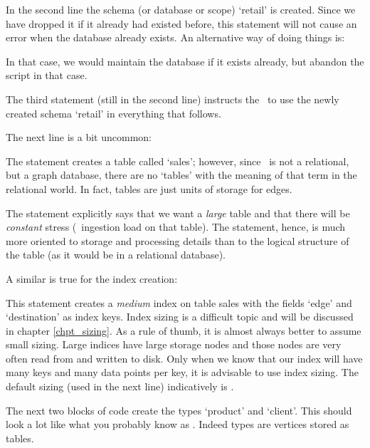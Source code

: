 In the second line the schema
(or database or scope) `retail'
is created. Since we have dropped it
if it already had existed before,
this statement will not cause
an error when the database already exists.
An alternative way of doing things is:


In that case, we would maintain the database
if it exists already, but abandon the
script in that case.

The third statement (still in the second line)
instructs the \nowdb\ to use the newly created
schema `retail' in everything that follows.

The next line is a bit uncommon:


The statement creates a table called `sales';
however, since \nowdb\ is not a relational,
but a graph database, there are no 
`tables' with the meaning of that term
in the relational world.
In fact, tables are just units of storage 
for edges. 

The statement explicitly says that we
want a \emph{large} table and that there
will be \emph{constant} stress (\ie\ ingestion load
on that table). The  statement,
hence, is much more oriented to storage
and processing details than to the logical structure
of the table (as it would be in a relational database).

A similar is true for the index creation:


This statement creates a \emph{medium} index on table sales
with the fields `edge' and `destination' as index keys.
Index sizing is a difficult topic and will be discussed
in chapter \ref{chpt_sizing}.
As a rule of thumb, it is almost always better to assume
small sizing. Large indices have large storage nodes
and those nodes are very often read from and written
to disk. Only when we know that our index will have
many keys and many data points per key, it is advisable
to use index sizing. The default sizing (used in the next
line) indicatively is .

The next two blocks of code create the types
`product' and `client'. This should look a lot like
what you probably know as . Indeed types
are vertices stored as  tables.

